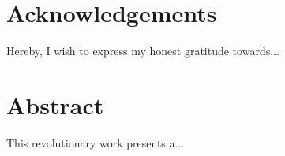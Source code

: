 \documentclass[11pt,a4paper]{book}
\def\biblio{}
\def\resources{\graphicspath{{"../res/imgs/"}}}
\begin{document}
\def\biblio{}
\def\resources{\graphicspath{{"./res/imgs/"}}} %

\frontmatter
\pagestyle{plain}
\cleardoublepage


\cleardoublepage

\setcounter{page}{5} %

\chapter*{Acknowledgements}
Hereby, I wish to express my honest gratitude towards...

\chapter*{Abstract}
This revolutionary work presents a...

\tableofcontents
\listoffigures
\listoftables
\lstlistoflistings

\mainmatter
\pagestyle{fancy} %





\appendix
\printglossaries

\end{document}
